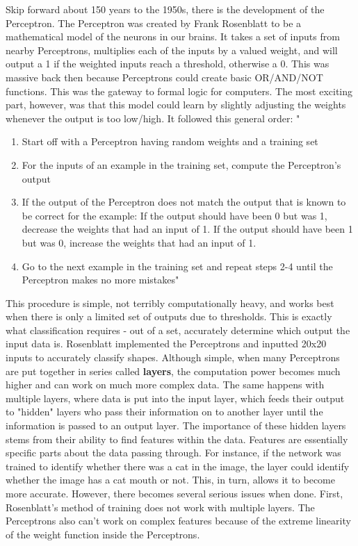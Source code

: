 \documentclass[12pt]{article}
\begin{document}
Skip forward about 150 years to the 1950s, there is the development of the Perceptron. The Perceptron was created by Frank Rosenblatt to be a mathematical model of the neurons in our brains. It takes a set of inputs from nearby Perceptrons, multiplies each of the inputs by a valued weight, and will output a 1 if the weighted inputs reach a threshold, otherwise a 0. This was massive back then because Perceptrons could create basic OR/AND/NOT functions. This was the gateway to formal logic for computers. The most exciting part, however, was that this model could learn by slightly adjusting the weights whenever the output is too low/high. It followed this general order: "
\begin{enumerate}
\item Start off with a Perceptron having random weights and a training set
\item For the inputs of an example in the training set, compute the Perceptron’s output
\item If the output of the Perceptron does not match the output that is known to be correct for the example: If the output should have been 0 but was 1, decrease the weights that had an input of 1. If the output should have been 1 but was 0, increase the weights that had an input of 1.
\item Go to the next example in the training set and repeat steps 2-4 until the Perceptron makes no more mistakes"
\end{enumerate}

This procedure is simple, not terribly computationally heavy, and works best when there is only a limited set of outputs due to thresholds. This is exactly what classification requires - out of a set, accurately determine which output the input data is. Rosenblatt implemented the Perceptrons and inputted 20x20 inputs to accurately classify shapes. Although simple, when many Perceptrons are put together in series called \textbf{layers}, the computation power becomes much higher and can work on much more complex data. The same happens with multiple layers, where data is put into the input layer, which feeds their output to "hidden" layers who pass their information on to another layer until the information is passed to an output layer. The importance of these hidden layers stems from their ability to find features within the data. Features are essentially specific parts about the data passing through. For instance, if the network was trained to identify whether there was a cat in the image, the layer could identify whether the image has a cat mouth or not. This, in turn, allows it to become more accurate. However, there becomes several serious issues when done. First, Rosenblatt's method of training does not work with multiple layers. The Perceptrons also can't work on complex features because of the extreme linearity of the weight function inside the Perceptrons. 
\end{document}
